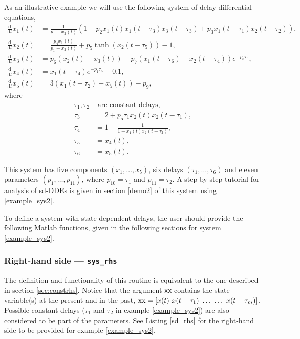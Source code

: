 \documentclass[10pt]{scrartcl}
\renewcommand{\d}{\mathrm{d}}
\newcommand{\blist}[1]{\mbox{\lstinline!#1!}}
\begin{document}
As an illustrative example we will use the following system of delay 
differential equations,
\begin{equation}\label{example_sys2}
  \begin{split}
    \frac{\d}{\d t}x_1(t)&=\frac{1}{p_1+x_2(t)}\left(1-p_2x_1(t)x_1(t-\tau_3)
      x_3(t-\tau_3)+p_3x_1(t-\tau_1)x_2(t-\tau_2)\right),\\
    \frac{\d}{\d t}x_2(t)&=\frac{p_4 x_1(t)}{p_1+x_2(t)}+
    p_5\tanh(x_2(t-\tau_5))-1,\\
    \frac{\d}{\d t}x_3(t)&=p_6(x_2(t)-x_3(t))-p_7(x_1(t-\tau_6)-x_2(t-\tau_4))e^{-p_8 \tau_5},\\
    \frac{\d}{\d t}x_4(t)&=x_1(t-\tau_4)e^{-p_1 \tau_5} -0.1,\\
    \frac{\d}{\d t}x_5(t)&=3(x_1(t-\tau_2)-x_5(t))-p_9,
  \end{split}
\end{equation}
where
\begin{align*}
\tau_1, \tau_2 &\mbox{ are constant delays},\\
\tau_3&=2+p_5\tau_1x_2(t)x_2(t-\tau_1),\\
\tau_4&=1-\frac{1}{1+x_1(t)x_2(t-\tau_2)},\\
\tau_5&=x_4(t),\\
\tau_6&=x_5(t).
\end{align*}

This system has five components $(x_1,\ldots,x_5)$, six delays
$(\tau_1,\ldots,\tau_6)$ and eleven parameters $(p_1,\ldots,p_{11})$,
where $p_{10}=\tau_1$ and $p_{11}=\tau_2$.  A step-by-step tutorial
for analysis of sd-DDEs is given in section \ref{demo2} of this system
using \eqref{example_sys2}.

To define a system with state-dependent delays, the user should
provide the following Matlab functions, given in the following
sections for system \eqref{example_sys2}.


\subsubsection{Right-hand side --- \blist{sys_rhs}}
\label{sec:sdrhs}
The definition and functionality of this routine is equivalent to the
one described in section \ref{sec:constrhs}.  Notice that the argument
\blist{xx} contains the state variable(s) at the present and in the
past, $\blist{xx}=[x(t)\ x(t-\tau_1)\ \ldots\ \ldots\ x(t-\tau_m)]$.
Possible constant delays ($\tau_1$ and $\tau_2$ in example
\eqref{example_sys2}) are also considered to be part of the
parameters. See Listing \ref{sd_rhs} for the right-hand side to be
provided for example \eqref{example_sys2}.

\end{document}
